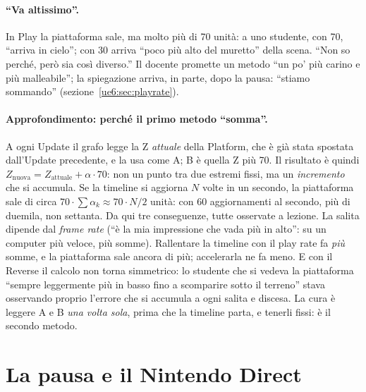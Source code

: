 \paragraph{``Va altissimo''.} In Play la piattaforma sale, ma molto più di 70 unità: a uno
studente, con 70, ``arriva in cielo''; con 30 arriva ``poco più alto del muretto'' della
scena. ``Non so perché, però sia così diverso.'' Il docente promette un metodo ``un po'
più carino e più malleabile''; la spiegazione arriva, in parte, dopo la pausa: ``stiamo
sommando'' (sezione~\ref{ue6:sec:playrate}).

\paragraph{Approfondimento: perché il primo metodo ``somma''.} A ogni Update il grafo
legge la Z \emph{attuale} della Platform, che è già stata spostata dall'Update
precedente, e la usa come A; B è quella Z più 70. Il risultato è quindi
$Z_{\text{nuova}} = Z_{\text{attuale}} + \alpha \cdot 70$: non un punto tra due estremi
fissi, ma un \emph{incremento} che si accumula. Se la timeline si aggiorna $N$ volte in
un secondo, la piattaforma sale di circa $70 \cdot \sum \alpha_k \approx 70 \cdot N/2$
unità: con 60 aggiornamenti al secondo, più di duemila, non settanta. Da qui tre
conseguenze, tutte osservate a lezione. La salita dipende dal \emph{frame rate} (``è la
mia impressione che vada più in alto'': su un computer più veloce, più somme). Rallentare
la timeline con il play rate fa \emph{più} somme, e la piattaforma sale ancora di più;
accelerarla ne fa meno. E con il Reverse il calcolo non torna simmetrico: lo studente
che si vedeva la piattaforma ``sempre leggermente più in basso fino a scomparire sotto il
terreno'' stava osservando proprio l'errore che si accumula a ogni salita e discesa. La
cura è leggere A e B \emph{una volta sola}, prima che la timeline parta, e tenerli fissi:
è il secondo metodo.

\section{La pausa e il Nintendo Direct}
\label{ue6:sec:pausa}

